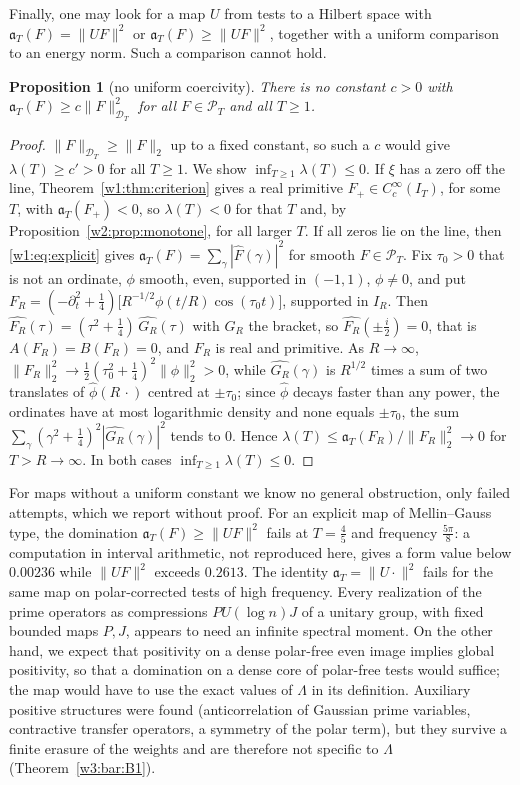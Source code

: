 \documentclass[11pt]{amsart}
\newtheorem{proposition}[theorem]{Proposition}
\theoremstyle{definition}
\theoremstyle{remark}
\numberwithin{equation}{section}
\newcommand{\IT}{I_T}                                  %
\newcommand{\Fh}{\widehat F}                           %
\newcommand{\PT}{\mathcal{P}_T}                        %
\newcommand{\DT}{\mathcal{D}_T}                        %
\newcommand{\aT}{\mathfrak{a}_T}                       %
\newcommand{\lam}{\lambda(T)}                          %
\begin{document}
Finally, one may look for a map $U$ from tests to a Hilbert space with $\aT(F)=\|UF\|^2$ or
$\aT(F)\ge\|UF\|^2$, together with a uniform comparison to an energy norm. Such a comparison cannot hold.

\begin{proposition}[no uniform coercivity]\label{w8:prop:nocoerc}
There is no constant $c>0$ with $\aT(F)\ge c\|F\|_{\DT}^2$ for all $F\in\PT$ and all $T\ge1$.
\end{proposition}

\begin{proof}
$\|F\|_{\DT}\ge\|F\|_2$ up to a fixed constant, so such a $c$ would give $\lam\ge c'>0$ for all $T\ge1$. We show
$\inf_{T\ge1}\lam\le0$. If $\xi$ has a zero off the line, Theorem~\ref{w1:thm:criterion} gives a real primitive
$F_+\in C_c^\infty(\IT)$, for some $T$, with $\aT(F_+)<0$, so $\lam<0$ for that $T$ and, by
Proposition~\ref{w2:prop:monotone}, for all larger $T$. If all zeros lie on the line, then
\eqref{w1:eq:explicit} gives $\aT(F)=\sum_\gamma|\Fh(\gamma)|^2$ for smooth $F\in\PT$. Fix $\tau_0>0$ that is not an
ordinate, $\phi$ smooth, even, supported in $(-1,1)$, $\phi\ne0$, and put
$F_R=(-\partial_t^2+\frac14)\bigl[R^{-1/2}\phi(t/R)\cos(\tau_0t)\bigr]$, supported in $I_R$. Then
$\widehat{F_R}(\tau)=(\tau^2+\frac14)\,\widehat{G_R}(\tau)$ with $G_R$ the bracket, so $\widehat{F_R}(\pm\frac i2)=0$,
that is $A(F_R)=B(F_R)=0$, and $F_R$ is real and primitive. As $R\to\infty$, $\|F_R\|_2^2\to\frac12(\tau_0^2+\frac14)^2\|\phi\|_2^2>0$,
while $\widehat{G_R}(\gamma)$ is $R^{1/2}$ times a sum of two translates of $\widehat\phi(R\,\cdot)$ centred at $\pm\tau_0$;
since $\widehat\phi$ decays faster than any power, the ordinates have at most logarithmic density and none equals
$\pm\tau_0$, the sum $\sum_\gamma(\gamma^2+\frac14)^2|\widehat{G_R}(\gamma)|^2$ tends to $0$. Hence
$\lambda(T)\le\aT(F_R)/\|F_R\|_2^2\to0$ for $T>R\to\infty$. In both cases $\inf_{T\ge1}\lam\le0$.
\end{proof}

For maps without a uniform constant we know no general obstruction, only failed attempts, which we report
without proof. For an explicit map of Mellin--Gauss type, the domination $\aT(F)\ge\|UF\|^2$ fails at
$T=\frac45$ and frequency $\frac{5\pi}8$: a computation in interval arithmetic, not reproduced here, gives a form value
below $0.00236$ while $\|UF\|^2$ exceeds $0.2613$. The identity $\aT=\|U\cdot\|^2$ fails for the same map on
polar-corrected tests of high frequency. Every realization of the prime operators as compressions
$PU(\log n)J$ of a unitary group, with fixed bounded maps $P,J$, appears to need an infinite spectral moment. On
the other hand, we expect that positivity on a dense polar-free even image implies global positivity, so that a
domination on a dense core of polar-free tests would suffice; the map would have to use the exact values of
$\Lambda$ in its definition. Auxiliary positive structures were found (anticorrelation of Gaussian prime
variables, contractive transfer operators, a symmetry of the polar term), but they survive a finite erasure of
the weights and are therefore not specific to $\Lambda$ (Theorem~\ref{w3:bar:B1}).
\end{document}
